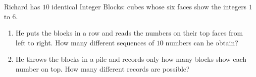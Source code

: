 Richard has $10$ identical Integer Blocks: cubes whose six faces show the integers $1$ to $6$.
\begin{enumerate}
\item[(a)] He puts the blocks in a row and reads the numbers on their top faces from left to right. How many different sequences of $10$ numbers can he obtain?
\item[(b)] He throws the blocks in a pile and records only how many blocks show each number on top. How many different records are possible?
\end{enumerate}
